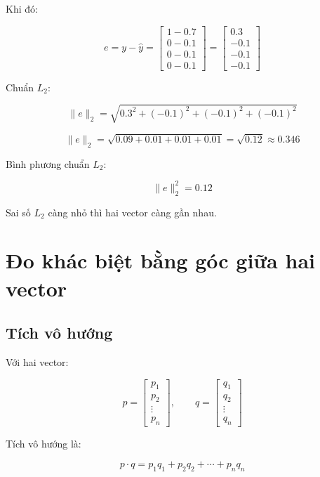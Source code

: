 \documentclass[12pt,a4paper]{report}
\begin{document}
Khi đó:

\[
    e = y-\hat{y}
    =
    \begin{bmatrix}
    1-0.7\\
    0-0.1\\
    0-0.1\\
    0-0.1
    \end{bmatrix}
    =
    \begin{bmatrix}
    0.3\\
    -0.1\\
    -0.1\\
    -0.1
    \end{bmatrix}
\]

Chuẩn $L_2$:

\[
    \|e\|_2
    =
    \sqrt{0.3^2+(-0.1)^2+(-0.1)^2+(-0.1)^2}
\]

\[
    \|e\|_2
    =
    \sqrt{0.09+0.01+0.01+0.01}
    =
    \sqrt{0.12}
    \approx 0.346
\]

Bình phương chuẩn $L_2$:

\[
    \|e\|_2^2 = 0.12
\]

\begin{ghinho}
Sai số $L_2$ càng nhỏ thì hai vector càng gần nhau.
\end{ghinho}

\chapter{Đo khác biệt bằng góc giữa hai vector}

\section{Tích vô hướng}

Với hai vector:

\[
    p =
    \begin{bmatrix}
    p_1\\p_2\\ \vdots\\p_n
    \end{bmatrix},
    \qquad
    q =
    \begin{bmatrix}
    q_1\\q_2\\ \vdots\\q_n
    \end{bmatrix}
\]

Tích vô hướng là:

\[
    p \cdot q = p_1q_1+p_2q_2+\cdots+p_nq_n
\]
\end{document}
